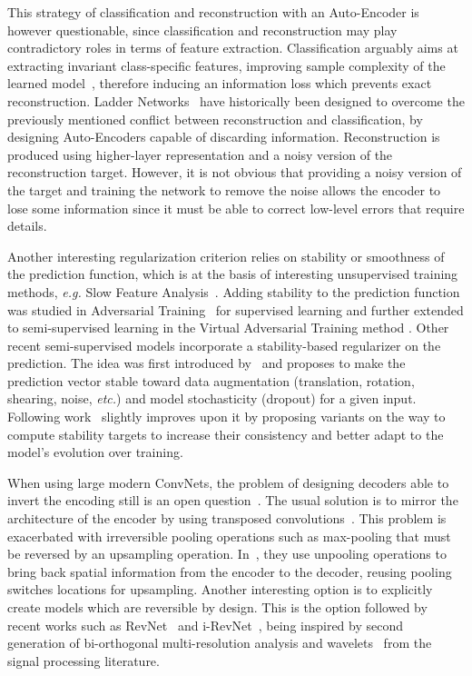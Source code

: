 \documentclass[runningheads]{llncs}
\begin{document}
This strategy of classification and reconstruction with an Auto-Encoder is however questionable, since classification and reconstruction may play contradictory roles in terms of feature extraction. Classification arguably aims at extracting invariant class-specific features, improving sample complexity of the learned model~\cite{hastie_09_elements-of.statistical-learning}, therefore inducing an information loss which prevents exact reconstruction. Ladder Networks~\cite{Rasmus2015} have historically been designed to overcome the previously mentioned conflict between reconstruction and classification, by designing Auto-Encoders capable of discarding information. Reconstruction is produced using higher-layer representation and a noisy version of the reconstruction target. However, it is not obvious that providing a noisy version of the target and training the network to remove the noise allows the encoder to lose some information since it must be able to correct low-level errors that require details.

Another interesting regularization criterion relies on stability or smoothness of the prediction function, which is at the basis of interesting unsupervised training methods, \textit{e.g.} Slow Feature Analysis~\cite{TheriaultCVPR13}. Adding stability to the prediction function was studied in Adversarial Training~\cite{goodfellow2014explaining} for supervised learning and further extended to semi-supervised learning in the Virtual Adversarial Training method \cite{miyato2015distributional}. Other recent semi-supervised models incorporate a stability-based regularizer on the prediction. The idea was first introduced by~\cite{Sajjadi2016} and proposes to make the prediction vector stable toward data augmentation (translation, rotation, shearing, noise, \textit{etc.}) and model stochasticity (dropout) for a given input. Following work~\cite{Laine2016,Tarvainen2017} slightly improves upon it by proposing variants on the way to compute stability targets to increase their consistency and better adapt to the model's evolution over training.

When using large modern ConvNets, the problem of designing decoders able to invert the encoding still is an open question~\cite{Wojna2017}. The usual solution is to mirror the architecture of the encoder by using transposed convolutions~\cite{dumoulin2016guide}.
This problem is exacerbated with irreversible pooling operations such as max-pooling that must be reversed by an upsampling operation. In~\cite{Zhao2016a,Zhang2016a}, they use unpooling operations to bring back spatial information from the encoder to the decoder, reusing pooling switches locations for upsampling.
Another interesting option is to explicitly create models which are reversible by design. This is the option followed by recent works such as RevNet~\cite{NIPS2017_6816} and i-RevNet~\cite{jacobsen:hal-01712808}, being inspired by second generation of bi-orthogonal multi-resolution analysis and wavelets~\cite{swe:spie95} from the signal processing literature.
\end{document}
